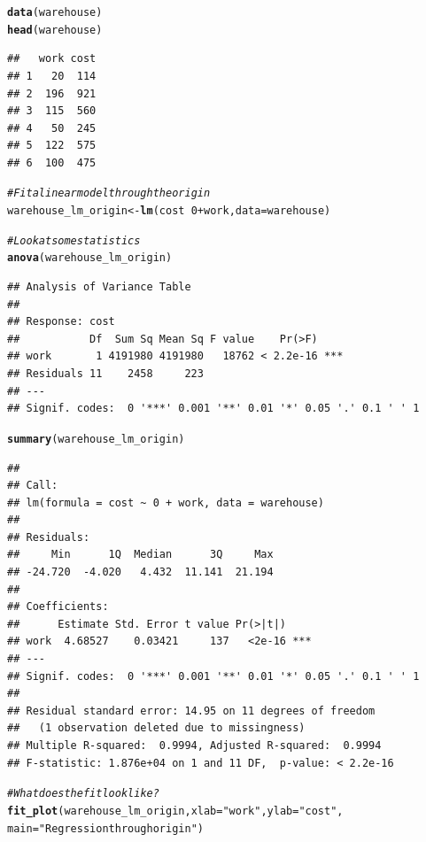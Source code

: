 \documentclass{article}\usepackage[]{graphicx}\usepackage[]{color}
\makeatletter
\newcommand{\hlnum}[1]{\textcolor[rgb]{0.686,0.059,0.569}{#1}}%
\newcommand{\hlstr}[1]{\textcolor[rgb]{0.192,0.494,0.8}{#1}}%
\newcommand{\hlcom}[1]{\textcolor[rgb]{0.678,0.584,0.686}{\textit{#1}}}%
\newcommand{\hlopt}[1]{\textcolor[rgb]{0,0,0}{#1}}%
\newcommand{\hlstd}[1]{\textcolor[rgb]{0.345,0.345,0.345}{#1}}%
\newcommand{\hlkwb}[1]{\textcolor[rgb]{0.69,0.353,0.396}{#1}}%
\newcommand{\hlkwc}[1]{\textcolor[rgb]{0.333,0.667,0.333}{#1}}%
\newcommand{\hlkwd}[1]{\textcolor[rgb]{0.737,0.353,0.396}{\textbf{#1}}}%
\newenvironment{kframe}{%
 \def\at@end@of@kframe{}%
 \ifinner\ifhmode%
  \def\at@end@of@kframe{\end{minipage}}%
  \begin{minipage}{\columnwidth}%
 \fi\fi%
 \def\FrameCommand##1{\hskip\@totalleftmargin \hskip-\fboxsep
 \colorbox{shadecolor}{##1}\hskip-\fboxsep
     \hskip-\linewidth \hskip-\@totalleftmargin \hskip\columnwidth}%
 \MakeFramed {\advance\hsize-\width
   \@totalleftmargin\z@ \linewidth\hsize
   \@setminipage}}%
 {\par\unskip\endMakeFramed%
 \at@end@of@kframe}
\newenvironment{knitrout}{}{} %
\makeatother
\begin{document}
\begin{knitrout}
\color{fgcolor}\begin{kframe}
\begin{alltt}
\hlkwd{data}\hlstd{(warehouse)}
\hlkwd{head}\hlstd{(warehouse)}
\end{alltt}
\begin{verbatim}
##   work cost
## 1   20  114
## 2  196  921
## 3  115  560
## 4   50  245
## 5  122  575
## 6  100  475
\end{verbatim}
\begin{alltt}
\hlcom{# Fit a linear model through the origin}
\hlstd{warehouse_lm_origin} \hlkwb{<-} \hlkwd{lm}\hlstd{(cost} \hlopt{~} \hlnum{0} \hlopt{+} \hlstd{work,} \hlkwc{data} \hlstd{= warehouse)}

\hlcom{# Look at some statistics}
\hlkwd{anova}\hlstd{(warehouse_lm_origin)}
\end{alltt}
\begin{verbatim}
## Analysis of Variance Table
## 
## Response: cost
##           Df  Sum Sq Mean Sq F value    Pr(>F)    
## work       1 4191980 4191980   18762 < 2.2e-16 ***
## Residuals 11    2458     223                      
## ---
## Signif. codes:  0 '***' 0.001 '**' 0.01 '*' 0.05 '.' 0.1 ' ' 1
\end{verbatim}
\begin{alltt}
\hlkwd{summary}\hlstd{(warehouse_lm_origin)}
\end{alltt}
\begin{verbatim}
## 
## Call:
## lm(formula = cost ~ 0 + work, data = warehouse)
## 
## Residuals:
##     Min      1Q  Median      3Q     Max 
## -24.720  -4.020   4.432  11.141  21.194 
## 
## Coefficients:
##      Estimate Std. Error t value Pr(>|t|)    
## work  4.68527    0.03421     137   <2e-16 ***
## ---
## Signif. codes:  0 '***' 0.001 '**' 0.01 '*' 0.05 '.' 0.1 ' ' 1
## 
## Residual standard error: 14.95 on 11 degrees of freedom
##   (1 observation deleted due to missingness)
## Multiple R-squared:  0.9994,	Adjusted R-squared:  0.9994 
## F-statistic: 1.876e+04 on 1 and 11 DF,  p-value: < 2.2e-16
\end{verbatim}
\begin{alltt}
\hlcom{# What does the fit look like?}
\hlkwd{fit_plot}\hlstd{(warehouse_lm_origin,} \hlkwc{xlab} \hlstd{=} \hlstr{"work"}\hlstd{,} \hlkwc{ylab} \hlstd{=} \hlstr{"cost"}\hlstd{,}
         \hlkwc{main} \hlstd{=} \hlstr{"Regression through origin"}\hlstd{)}
\end{alltt}
\end{kframe}

\end{knitrout}
\end{document}
